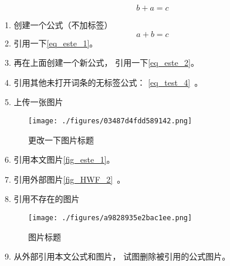 

\begin{equation}\label{eq_este_2}
b + a = c
\end{equation}

1. 创建一个公式（不加标签）
\begin{equation}\label{eq_este_1}
a + b = c
\end{equation}
2. 引用一下\autoref{eq_este_1}。

3. 再在上面创建一个新公式， 引用一下\autoref{eq_este_2}。

4. 引用其他未打开词条的无标签公式： \autoref{eq_test_4}~。

5. 上传一张图片
\begin{figure}[ht]
\centering
\texttt{[image: ./figures/03487d4fdd589142.png]}
\caption{更改一下图片标题} \label{fig_este_1}
\end{figure}
6. 引用本文图片\autoref{fig_este_1}。

7. 引用外部图片\autoref{fig_HWF_2}~。

8. 引用不存在的图片

\begin{figure}[ht]
\centering
\texttt{[image: ./figures/a9828935e2bac1ee.png]}
\caption{图片标题} \label{fig_este_2}
\end{figure}

9. 从外部引用本文公式和图片， 试图删除被引用的公式图片。
